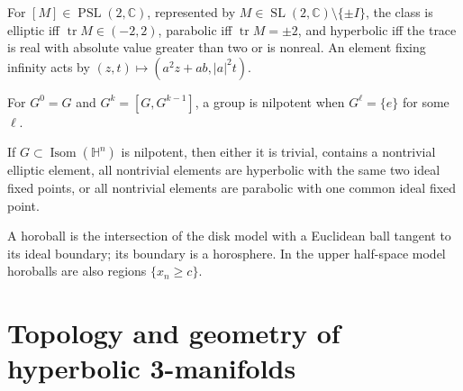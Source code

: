 \begin{lemma}
\label{lem:chow-iv-trace-isometry-classification}

For \([M]\in\operatorname{PSL}(2,\mathbb C)\), represented by
\(M\in\operatorname{SL}(2,\mathbb C)\setminus\{\pm I\}\), the class is
elliptic iff \(\operatorname{tr}M\in(-2,2)\), parabolic iff
\(\operatorname{tr}M=\pm2\), and hyperbolic iff the trace is real with
absolute value greater than two or is nonreal.  An element fixing infinity
acts by \((z,t)\mapsto(a^2z+ab,|a|^2t)\).
\end{lemma}

\begin{definition}
\label{def:chow-iv-nilpotent-group}

For \(G^0=G\) and \(G^k=[G,G^{k-1}]\), a group is nilpotent when
\(G^\ell=\{e\}\) for some \(\ell\).
\end{definition}

\begin{lemma}
\label{lem:chow-iv-nilpotent-isometry-subgroups}


If \(G\subset\operatorname{Isom}(\mathbb H^n)\) is nilpotent, then either it is
trivial, contains a nontrivial elliptic element, all nontrivial elements are
hyperbolic with the same two ideal fixed points, or all nontrivial elements are
parabolic with one common ideal fixed point.
\end{lemma}

\begin{definition}
\label{def:chow-iv-horoball}

A horoball is the intersection of the disk model with a Euclidean ball tangent
to its ideal boundary; its boundary is a horosphere.  In the upper half-space
model horoballs are also regions \(\{x_n\ge c\}\).
\end{definition}

\section{Topology and geometry of hyperbolic 3-manifolds}

